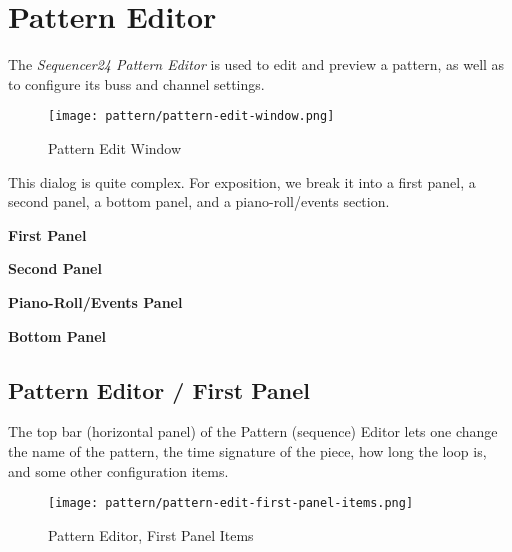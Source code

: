 %
%

\section{Pattern Editor}
\label{sec:seq24_pattern_editor}

   The \textsl{Sequencer24 Pattern Editor} is used to edit and preview a
   pattern, as well as to configure its buss and channel settings.

\begin{figure}[H]
   \centering 
   \texttt{[image: pattern/pattern-edit-window.png]}
   \caption{Pattern Edit Window}
   \label{fig:pattern_edit_window}
\end{figure}

   This dialog is quite complex.
   For exposition, we break it into a first panel, a second panel, a
   bottom panel, and a piano-roll/events section.

   \begin{enumber}
      \item \textbf{First Panel}
      \item \textbf{Second Panel}
      \item \textbf{Piano-Roll/Events Panel}
      \item \textbf{Bottom Panel}
   \end{enumber}

\subsection{Pattern Editor / First Panel}
\label{subsec:seq24_pattern_editor_first}

   The top bar (horizontal panel) of the Pattern (sequence) Editor
   lets one change the name of
   the pattern, the time signature of the piece, how long the loop is, and
   some other configuration items.

\begin{figure}[H]
   \centering 
   \texttt{[image: pattern/pattern-edit-first-panel-items.png]}
   \caption{Pattern Editor, First Panel Items}
   \label{fig:pattern_editor_first_panel_items}
\end{figure}

